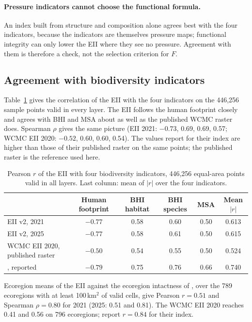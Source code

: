 \documentclass[11pt,a4paper]{article}
\begin{document}
\paragraph{Pressure indicators cannot choose the functional formula.} An index built from
structure and composition alone agrees best with the four indicators, because the indicators are
themselves pressure maps; functional integrity can only lower the EII where they see no pressure.
Agreement with them is therefore a check, not the selection criterion for $F$.

\subsection{Agreement with biodiversity indicators}
\label{sec:indicators}

Table~\ref{tab:indicators} gives the correlation of the EII with the four indicators on the
446,256 sample points valid in every layer. The EII follows the human footprint closely and
agrees with BHI and MSA about as well as the published WCMC raster does. Spearman $\rho$ gives
the same picture (EII 2021: $-0.73$, 0.69, 0.69, 0.57; WCMC EII 2020: $-0.52$, 0.60, 0.60,
0.54). The values \citet{hill2026} report for their index are higher than those of their
published raster on the same points; the published raster is the reference used here.

\begin{table}[H]
\centering\small
\caption{Pearson $r$ of the EII with four biodiversity indicators, 446,256 equal-area points
valid in all layers. Last column: mean of $|r|$ over the four indicators.}
\label{tab:indicators}
\begin{tabular}{lccccc}
\toprule
 & Human footprint & BHI habitat & BHI species & MSA & Mean $|r|$ \\
\midrule
EII v2, 2021 & $-0.77$ & 0.58 & 0.60 & 0.50 & 0.613 \\
EII v2, 2025 & $-0.77$ & 0.58 & 0.61 & 0.50 & 0.615 \\
WCMC EII 2020, published raster & $-0.50$ & 0.54 & 0.55 & 0.50 & 0.524 \\
\citet{hill2026}, reported & $-0.79$ & 0.75 & 0.76 & 0.66 & 0.740 \\
\bottomrule
\end{tabular}
\end{table}

Ecoregion means of the EII against the ecoregion intactness of \citet{beyer2020}, over the 789
ecoregions with at least 100\,km$^2$ of valid cells, give Pearson $r = 0.51$ and Spearman
$\rho = 0.80$ for 2021 (2025: 0.51 and 0.81). The WCMC EII 2020 reaches 0.41 and 0.56 on 796
ecoregions; \citet{hill2026} report $r = 0.84$ for their index.
\end{document}
